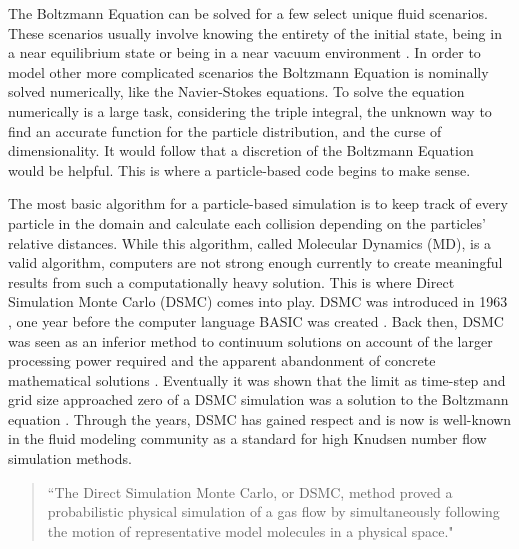 \indent The Boltzmann Equation can be solved for a few select unique fluid scenarios. These scenarios usually involve knowing the entirety of the initial state, being in a near equilibrium state or being in a near vacuum environment \cite{boltzmann_solved}. In order to model other more complicated scenarios the Boltzmann Equation is nominally solved numerically, like the Navier-Stokes equations. To solve the equation numerically is a large task, considering the triple integral, the unknown way to find an accurate function for the particle distribution, and the curse of dimensionality. It would follow that a discretion of the Boltzmann Equation would be helpful. This is where a particle-based code begins to make sense. \par

\indent The most basic algorithm for a particle-based simulation is to keep track of every particle in the domain and calculate each collision depending on the particles' relative distances. While this algorithm, called Molecular Dynamics (MD), is a valid algorithm, computers are not strong enough currently to create meaningful results from such a computationally heavy solution. This is where Direct Simulation Monte Carlo (DSMC) comes into play. DSMC was introduced in 1963 \cite{dsmc_speed}, one year before the computer language BASIC was created \cite{basic}. Back then, DSMC was seen as an inferior method to continuum solutions on account of the larger processing power required and the apparent abandonment of concrete mathematical solutions \cite{dsmc_speed}. Eventually it was shown that the limit as time-step and grid size approached zero of a DSMC simulation was a solution to the Boltzmann equation \cite{bird_dsmc}. Through the years, DSMC has gained respect and is now is well-known in the fluid modeling community as a standard for high Knudsen number flow simulation methods.\par

\begin{quote}
    ``The Direct Simulation Monte Carlo, or DSMC, method proved a probabilistic physical simulation of a gas flow by simultaneously following the motion of representative model molecules in a physical space." \cite{bird_dsmc}
\end{quote}


